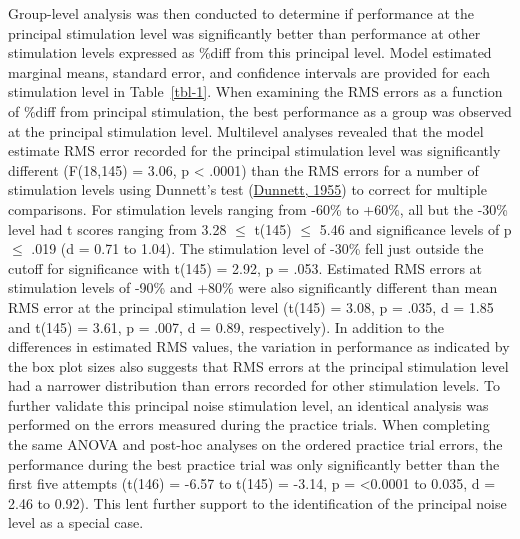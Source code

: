 \documentclass[]{cik}%
\begin{document}
Group-level analysis was then conducted to determine if performance at
the principal stimulation level was significantly better than
performance at other stimulation levels expressed as \%diff from this
principal level. Model estimated marginal means, standard error, and
confidence intervals are provided for each stimulation level in
Table~\ref{tbl-1}. When examining the RMS errors as a function of \%diff
from principal stimulation, the best performance as a group was observed
at the principal stimulation level. Multilevel analyses revealed that
the model estimate RMS error recorded for the principal stimulation
level was significantly different (F(18,145) = 3.06, p \textless{}
.0001) than the RMS errors for a number of stimulation levels using
Dunnett's test (\protect\hyperlink{ref-dunnett1955}{Dunnett, 1955}) to
correct for multiple comparisons. For stimulation levels ranging from
-60\% to +60\%, all but the -30\% level had t scores ranging from 3.28
\(\le\) t(145) \(\le\) 5.46 and significance levels of p \(\le\) .019 (d
= 0.71 to 1.04). The stimulation level of -30\% fell just outside the
cutoff for significance with t(145) = 2.92, p = .053. Estimated RMS
errors at stimulation levels of -90\% and +80\% were also significantly
different than mean RMS error at the principal stimulation level (t(145)
= 3.08, p = .035, d = 1.85 and t(145) = 3.61, p = .007, d = 0.89,
respectively). In addition to the differences in estimated RMS values,
the variation in performance as indicated by the box plot sizes also
suggests that RMS errors at the principal stimulation level had a
narrower distribution than errors recorded for other stimulation levels.
To further validate this principal noise stimulation level, an identical
analysis was performed on the errors measured during the practice
trials. When completing the same ANOVA and post-hoc analyses on the
ordered practice trial errors, the performance during the best practice
trial was only significantly better than the first five attempts (t(146)
= -6.57 to t(145) = -3.14, p = \textless0.0001 to 0.035, d = 2.46 to
0.92). This lent further support to the identification of the principal
noise level as a special case.
\end{document}
